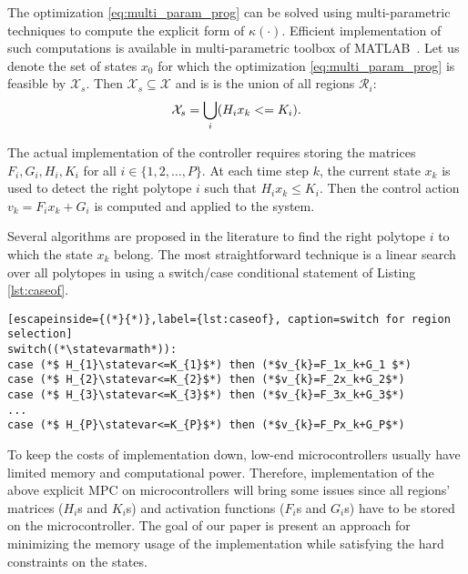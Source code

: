 
The optimization \eqref{eq:multi_param_prog} can be solved using multi-parametric techniques to compute the explicit form of $\kappa(\cdot)$.
Efficient implementation of such computations is available in multi-parametric toolbox of MATLAB~\cite{matlabMPT, matlabYALMIP}.
Let us denote the set of states $x_0$ for which the optimization  \eqref{eq:multi_param_prog} is feasible by $\mathcal X_s$. Then $\mathcal X_s\subseteq \mathcal X$ and is is the union of all regions $\mathcal{R}_{i}$:
\begin{equation}
\mathcal X_s = \bigcup_{i}(H_{i}x_{k}<=K_{i}).
\end{equation}


The actual implementation of the controller requires storing the matrices $F_i,G_i,H_i,K_i$ for all $i\in\{1,2,\ldots,P\}$. At each time step $k$, the current state $x_k$ is used to detect the right polytope $i$ such that $H_i x_k\le K_i$. Then the control action $v_k = F_i x_k + G_i$ is computed and applied to the system.

Several algorithms are proposed in the literature \cite{Mnnigmann:2011,Jones:2006} to find the right polytope $i$ to which the state $x_k$ belong. The most straightforward technique is a linear search over all polytopes in \statespace\space using a switch/case conditional statement of Listing \ref{lst:caseof}.

\begin{lstlisting}[escapeinside={(*}{*)},label={lst:caseof}, caption=switch for region selection]
switch((*\statevarmath*)):
case (*$ H_{1}\statevar<=K_{1}$*) then (*$v_{k}=F_1x_k+G_1 $*)
case (*$ H_{2}\statevar<=K_{2}$*) then (*$v_{k}=F_2x_k+G_2$*)
case (*$ H_{3}\statevar<=K_{3}$*) then (*$v_{k}=F_3x_k+G_3$*)
...
case (*$ H_{P}\statevar<=K_{P}$*) then (*$v_{k}=F_Px_k+G_P$*)
\end{lstlisting}

To keep the costs of implementation down, low-end microcontrollers usually have limited memory and computational power. Therefore, implementation of the above explicit MPC on microcontrollers will bring some issues since all regions' matrices ($H_i$s and $K_i$s) and activation functions ($F_i$s and $G_i$s) have to be stored on the microcontroller. The goal of our paper is present an approach for minimizing the memory usage of the implementation while satisfying the hard constraints on the states. 
